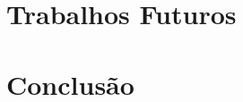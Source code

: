 \documentclass[12pt]{article}
\begin{document}
\section{Trabalhos Futuros}

\section{Conclusão}



\end{document}
